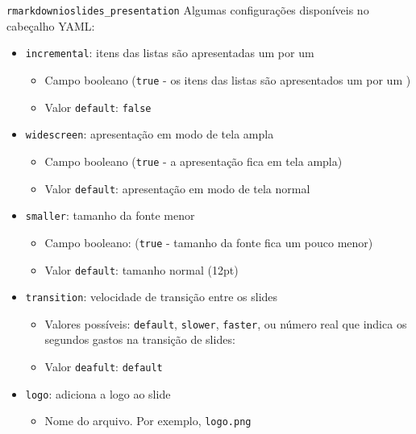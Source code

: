 \documentclass[
  10pt,
  ignorenonframetext,
]{beamer}
\providecommand{\tightlist}{%
  \setlength{\itemsep}{0pt}\setlength{\parskip}{0pt}}\usepackage{longtable,booktabs,array}
\begin{document}
\begin{frame}[fragile]{\texttt{rmarkdown}\newline \texttt{ioslides\_presentation}}
\protect\hypertarget{rmarkdownioslides_presentation-3}{}
Algumas configurações disponíveis no cabeçalho YAML:

\begin{itemize}
\tightlist
\item
  \texttt{incremental}: itens das listas são apresentadas um por um

  \begin{itemize}
  \tightlist
  \item
    Campo booleano (\texttt{true} - os itens das listas são apresentados
    um por um )
  \item
    Valor \texttt{default}: \texttt{false}
  \end{itemize}
\item
  \texttt{widescreen}: apresentação em modo de tela ampla

  \begin{itemize}
  \tightlist
  \item
    Campo booleano (\texttt{true} - a apresentação fica em tela ampla)
  \item
    Valor \texttt{default}: apresentação em modo de tela normal
  \end{itemize}
\item
  \texttt{smaller}: tamanho da fonte menor

  \begin{itemize}
  \tightlist
  \item
    Campo booleano: (\texttt{true} - tamanho da fonte fica um pouco
    menor)
  \item
    Valor \texttt{default}: tamanho normal (12pt)
  \end{itemize}
\item
  \texttt{transition}: velocidade de transição entre os slides

  \begin{itemize}
  \tightlist
  \item
    Valores possíveis: \texttt{default}, \texttt{slower},
    \texttt{faster}, ou número real que indica os segundos gastos na
    transição de slides:
  \item
    Valor \texttt{deafult}: \texttt{default}
  \end{itemize}
\item
  \texttt{logo}: adiciona a logo ao slide

  \begin{itemize}
  \tightlist
  \item
    Nome do arquivo. Por exemplo, \texttt{logo.png}
  \end{itemize}
\end{itemize}
\end{frame}
\end{document}
